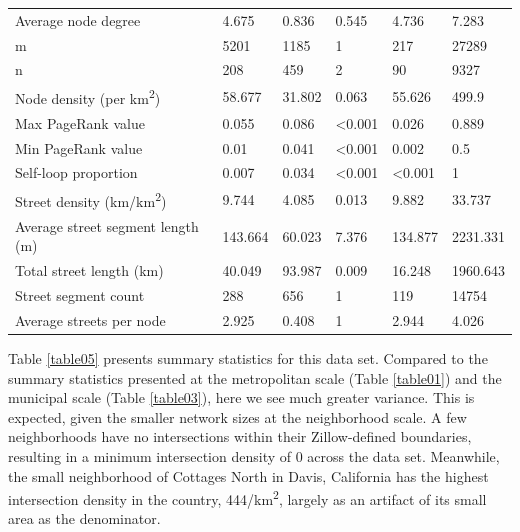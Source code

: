 \documentclass{article}
\begin{document}
\begin{table}
\begin{tabular}{llllll}
	Average node degree                         & 4.675   & 0.836   & 0.545          & 4.736          & 7.283    \\
	m                                           & 5201    & 1185    & 1              & 217            & 27289    \\
	n                                           & 208     & 459     & 2              & 90             & 9327     \\
	Node density (per km\textsuperscript{2})                      & 58.677  & 31.802  & 0.063          & 55.626         & 499.9    \\
	Max PageRank value                          & 0.055   & 0.086   & \textless0.001 & 0.026          & 0.889    \\
	Min PageRank value                          & 0.01    & 0.041   & \textless0.001 & 0.002          & 0.5      \\
	Self-loop proportion                        & 0.007   & 0.034   & \textless0.001 & \textless0.001 & 1        \\
	Street density (km/km\textsuperscript{2})                     & 9.744   & 4.085   & 0.013          & 9.882          & 33.737   \\
	Average street segment length (m)           & 143.664 & 60.023  & 7.376          & 134.877        & 2231.331 \\
	Total street length (km)                    & 40.049  & 93.987  & 0.009          & 16.248         & 1960.643 \\
	Street segment count                        & 288     & 656     & 1              & 119            & 14754    \\
	Average streets per node                    & 2.925   & 0.408   & 1              & 2.944          & 4.026    \\
	\bottomrule
\end{tabular}
\end{table}

Table \ref{table05} presents summary statistics for this data set. Compared to the summary statistics presented at the metropolitan scale (Table \ref{table01}) and the municipal scale (Table \ref{table03}), here we see much greater variance. This is expected, given the smaller network sizes at the neighborhood scale. A few neighborhoods have no intersections within their Zillow-defined boundaries, resulting in a minimum intersection density of 0 across the data set. Meanwhile, the small neighborhood of Cottages North in Davis, California has the highest intersection density in the country, 444/km\textsuperscript{2}, largely as an artifact of its small area as the denominator. 
\end{document}
